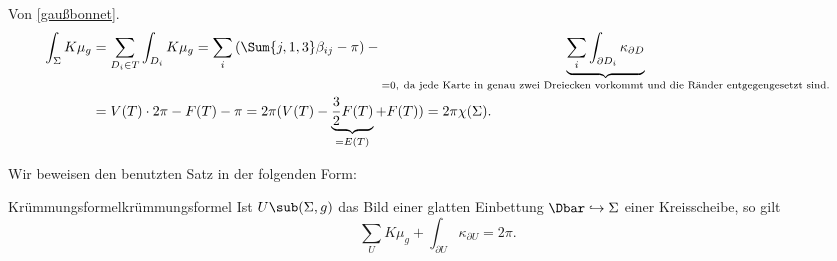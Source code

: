 \begin{beweis}Von \ref{gaußbonnet}.\\
\begin{align}
\int_\Sigma K \mu_g &= \sum_{D_i \in T} \int_{D_i} K \mu_g = \sum_i \left(\Sum{j,1,3} \beta_{ij} - \pi \right) - \underbrace{\sum_i \int_{\partial D_i} \kappa_{\partial D}}_{=0, \ \text{da jede Karte in genau zwei Dreiecken vorkommt und die Ränder entgegengesetzt sind.}}\\
&= V(T) \cdot 2 \pi - F(T) - \pi = 2\pi (V(T)- \underbrace{\frac{3}{2} F(T)}_{=E(T)} + F(T)) = 2\pi \chi(\Sigma).
\end{align}
\end{beweis}
Wir beweisen den benutzten Satz in der folgenden Form:
\begin{satz}{Krümmungsformel}{krümmungsformel}
Ist $U\sub (\Sigma, g)$ das Bild einer glatten Einbettung $\Dbar \hookrightarrow \Sigma$ einer Kreisscheibe, so gilt
\begin{equation}
\sum_U K \mu_g + \int_{\partial U} \kappa_{\partial U} = 2 \pi.
\end{equation}
\end{satz}
